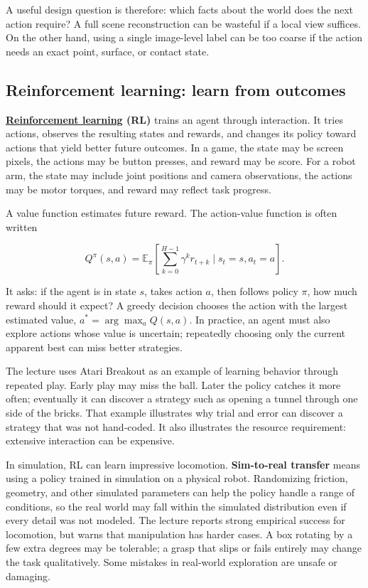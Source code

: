 A useful design question is therefore: which facts about the world does the next action require? A full scene reconstruction can be wasteful if a local view suffices. On the other hand, using a single image-level label can be too coarse if the action needs an exact point, surface, or contact state.

\subsection{Reinforcement learning: learn from outcomes}\label{04-visual-computing-ii-ch034-reinforcement-learning-learn-from-outcomes}

\textbf{\hyperref[appendix-b0c42da325f1]{Reinforcement learning} (RL)} trains an agent through interaction. It tries actions, observes the resulting states and rewards, and changes its policy toward actions that yield better future outcomes. In a game, the state may be screen pixels, the actions may be button presses, and reward may be score. For a robot arm, the state may include joint positions and camera observations, the actions may be motor torques, and reward may reflect task progress.

A value function estimates future reward. The action-value function is often written

\[
Q^\pi(s,a)=\mathbb{E}_{\pi}\left[\sum_{k=0}^{H-1}\gamma^k r_{t+k}\mid s_t=s,a_t=a\right].
\]

It asks: if the agent is in state \(s\), takes action \(a\), then follows policy \(\pi\), how much reward should it expect? A greedy decision chooses the action with the largest estimated value, \(a^*=\arg\max_a Q(s,a)\). In practice, an agent must also explore actions whose value is uncertain; repeatedly choosing only the current apparent best can miss better strategies.

The lecture uses Atari Breakout as an example of learning behavior through repeated play. Early play may miss the ball. Later the policy catches it more often; eventually it can discover a strategy such as opening a tunnel through one side of the bricks. That example illustrates why trial and error can discover a strategy that was not hand-coded. It also illustrates the resource requirement: extensive interaction can be expensive.

In simulation, RL can learn impressive locomotion. \textbf{Sim-to-real transfer} means using a policy trained in simulation on a physical robot. Randomizing friction, geometry, and other simulated parameters can help the policy handle a range of conditions, so the real world may fall within the simulated distribution even if every detail was not modeled. The lecture reports strong empirical success for locomotion, but warns that manipulation has harder cases. A box rotating by a few extra degrees may be tolerable; a grasp that slips or fails entirely may change the task qualitatively. Some mistakes in real-world exploration are unsafe or damaging.

